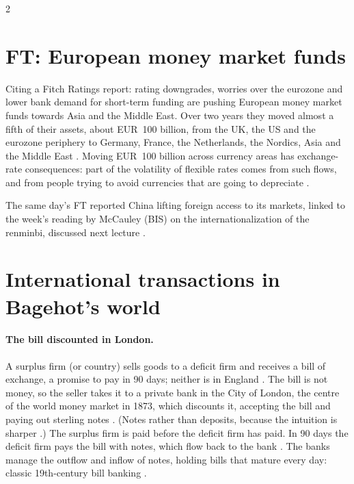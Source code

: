 \begin{paracol}{2}
\section{FT: European money market funds}\label{sec:gl-ft}

\begin{casestudy}
Citing a Fitch Ratings report: rating downgrades, worries over the eurozone and lower bank demand for short-term funding are pushing European money market
funds towards Asia and the Middle East. Over two years they moved almost a fifth of their assets, about EUR~100 billion, from the UK, the US and the eurozone
periphery to Germany, France, the Netherlands, the Nordics, Asia and the Middle East . Moving EUR~100 billion
across currency areas has exchange-rate consequences: part of the volatility of flexible rates comes from such flows, and from people trying to avoid
currencies that are going to depreciate .
\end{casestudy}

\begin{aside}
The same day's FT reported China lifting foreign access to its markets, linked to the week's reading by McCauley (BIS) on the internationalization of the renminbi,
discussed next lecture .
\end{aside}

\section{International transactions in Bagehot's world}\label{sec:gl-transactions}

\paragraph{The bill discounted in London.} A surplus firm (or country) sells goods to a deficit firm and receives a bill of exchange, a promise to pay in 90 days;
neither is in England . The bill is not money, so the seller takes it to a private bank in the City of London,
the centre of the world money market in 1873, which discounts it, accepting the bill and paying out sterling notes .
(Notes rather than deposits, because the intuition is sharper .) The surplus firm is paid before the deficit firm has paid. In 90 days the
deficit firm pays the bill with notes, which flow back to the bank . The banks manage the outflow and inflow of
notes, holding bills that mature every day: classic 19th-century bill banking .


\end{paracol}
